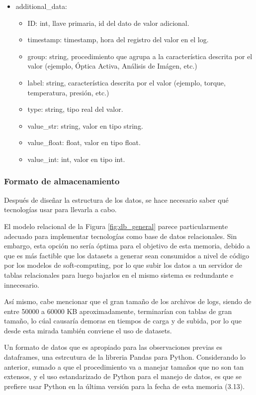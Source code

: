 \begin{enumerate}
\begin{itemize}
    \item additional\_data:
        \begin{itemize}
            \item ID: int, llave primaria, id del dato de valor adicional.
            \item timestamp: timestamp, hora del registro del valor en el log.
            \item group: string, procedimiento que agrupa a la característica descrita por el valor (ejemplo, Óptica Activa, Análisis de Imágen, etc.)
            \item label: string, característica descrita por el valor (ejemplo, torque, temperatura, presión, etc.)
            \item type: string, tipo real del valor.
            \item value\_str: string, valor en tipo string.
            \item value\_float: float, valor en tipo float.
            \item value\_int: int, valor en tipo int.
        \end{itemize}
\end{itemize}

\subsubsection{Formato de almacenamiento}

Después de diseñar la estructura de los datos, se hace necesario saber qué tecnologías usar para llevarla a cabo.

El modelo relacional de la Figura \ref{fig:db_general} parece particularmente adecuado para implementar tecnologías como base de datos relacionales. Sin embargo, esta opción no sería óptima para el objetivo de esta memoria, debido a que es más factible que los datasets a generar sean consumidos a nivel de código por los modelos de soft-computing, por lo que subir los datos a un servidor de tablas relacionales para luego bajarlos en el mismo sistema es redundante e innecesario.

Así mismo, cabe mencionar que el gran tamaño de los archivos de logs, siendo de entre 50000 a 60000 KB aproximadamente, terminarían con tablas de gran tamaño, lo cúal causaría demoras en tiempos de carga y de subida, por lo que desde esta mirada también conviene el uso de datasets.

Un formato de datos que es apropiado para las observaciones previas es dataframes, una estrcutura de la libreria Pandas para Python. Considerando lo anterior, sumado a que el procedimiento va a manejar tamaños que no son tan extensos, y el uso estandarizado de Python para el manejo de datos, es que se prefiere usar Python en la última versión para la fecha de esta memoria (3.13).


\end{enumerate}
